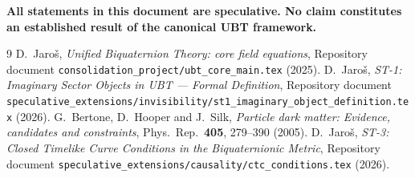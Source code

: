\documentclass[12pt]{article}
\begin{document}
\medskip
\noindent\textbf{All statements in this document are speculative.
No claim constitutes an established result of the canonical UBT framework.}


\begin{thebibliography}{9}
  D.~Jaroš,
  \emph{Unified Biquaternion Theory: core field equations},
  Repository document \texttt{consolidation\_project/ubt\_core\_main.tex} (2025).
  D.~Jaroš,
  \emph{ST-1: Imaginary Sector Objects in UBT — Formal Definition},
  Repository document
  \texttt{speculative\_extensions/invisibility/st1\_imaginary\_object\_definition.tex}
  (2026).
  G.~Bertone, D.~Hooper and J.~Silk,
  \emph{Particle dark matter: Evidence, candidates and constraints},
  Phys.\ Rep.\ \textbf{405}, 279--390 (2005).
  D.~Jaroš,
  \emph{ST-3: Closed Timelike Curve Conditions in the Biquaternionic Metric},
  Repository document \texttt{speculative\_extensions/causality/ctc\_conditions.tex}
  (2026).
\end{thebibliography}
\end{document}
